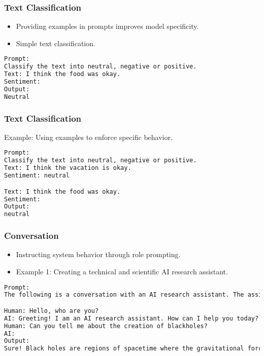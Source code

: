 \begin{frame}[fragile]\frametitle{Text Classification}
\begin{itemize}
    \item Providing examples in prompts improves model specificity.
    \item Simple text classification.
\end{itemize}
\begin{lstlisting}[language=HTML]
Prompt:
Classify the text into neutral, negative or positive. 
Text: I think the food was okay. 
Sentiment:
Output:
Neutral
\end{lstlisting}

\end{frame}

\begin{frame}[fragile]\frametitle{Text Classification}
Example: Using examples to enforce specific behavior.
\begin{lstlisting}[language=HTML]
Prompt:
Classify the text into neutral, negative or positive. 
Text: I think the vacation is okay.
Sentiment: neutral 

Text: I think the food was okay. 
Sentiment:
Output:
neutral
\end{lstlisting}
\end{frame}

\begin{frame}[fragile]\frametitle{Conversation}
\begin{itemize}
    \item Instructing system behavior through role prompting.
    \item Example 1: Creating a technical and scientific AI research assistant.
\end{itemize}
\begin{lstlisting}[language=HTML]
Prompt:
The following is a conversation with an AI research assistant. The assistant tone is technical and scientific.

Human: Hello, who are you?
AI: Greeting! I am an AI research assistant. How can I help you today?
Human: Can you tell me about the creation of blackholes?
AI:
Output:
Sure! Black holes are regions of spacetime where the gravitational force is so strong that nothing, not even light, can escape from it. They are created when a very massive star dies and its core collapses in on itself, forming a singularity of infinite density. The intense gravity of the singularity pulls in all the matter and radiation around it, creating the black hole.
\end{lstlisting}
\end{frame}

